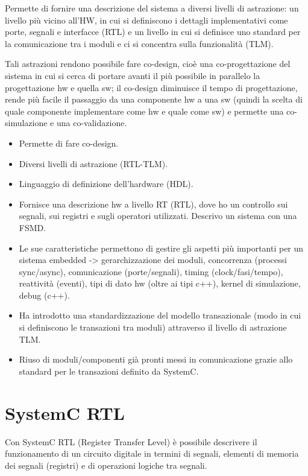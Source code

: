 \documentclass[a4paper]{article}
\theoremstyle{definition}
\begin{document}
		\noindent
		Permette di fornire una descrizione del sistema a diversi livelli di astrazione: un livello più vicino all'HW, in cui si definiscono i dettagli implementativi come porte, segnali e interfacce (RTL) e un livello in cui si definisce uno standard per la comunicazione tra i moduli e ci si concentra sulla funzionalità (TLM).
		\bigskip
		
		\noindent
		Tali astrazioni rendono possibile fare co-design, cioè una co-progettazione del sistema in cui si cerca di portare avanti il più possibile in parallelo la progettazione hw e quella sw; il co-design diminuisce il tempo di progettazione, rende più facile il passaggio da una componente hw a una sw (quindi la scelta di quale componente implementare come hw e quale come sw) e permette una co-simulazione e una co-validazione.
	\begin{itemize}
		\item Permette di fare co-design.
		\item Diversi livelli di astrazione (RTL-TLM).
		\item Linguaggio di definizione dell'hardware (HDL).
		\item Fornisce una descrizione hw a livello RT (RTL), dove ho un controllo sui segnali, sui registri e sugli operatori utilizzati. Descrivo un sistema con una FSMD.
		\item Le sue caratteristiche permettono di gestire gli aspetti più importanti per un sistema embedded -> gerarchizzazione dei moduli, concorrenza (processi sync/async), comunicazione (porte/segnali), timing (clock/fasi/tempo), reattività (eventi), tipi di dato hw (oltre ai tipi c++), kernel di simulazione, debug (c++).
		\item Ha introdotto una standardizzazione del modello transazionale (modo in cui si definiscono le transazioni tra moduli) attraverso il livello di astrazione TLM.
		\item Riuso di moduli/componenti già pronti messi in comunicazione grazie allo standard per le transazioni definito da SystemC.
	\end{itemize}
	
	\section{SystemC RTL}
		Con SystemC RTL (Register Transfer Level) è possibile descrivere il funzionamento di un circuito digitale in termini di segnali, elementi di memoria dei segnali (registri) e di operazioni logiche tra segnali.
		
\end{document}
